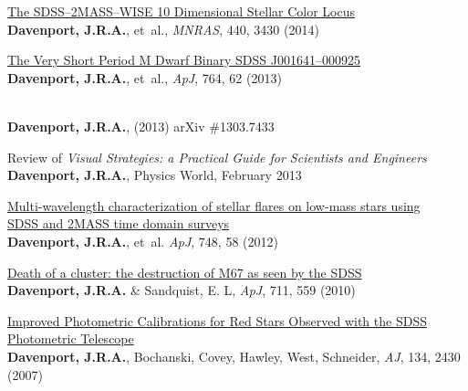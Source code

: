 \documentclass{article}
\begin{document}
\begin{llist}
\begin{etaremune}[leftmargin=10pt]
\item{\sc \href{http://adsabs.harvard.edu/abs/2014MNRAS.440.3430D}{\color{NavyBlue}The SDSS--2MASS--WISE 10 Dimensional Stellar Color Locus}}\\
{\bf Davenport, J.R.A.}, et~al., {\em MNRAS}, 440, 3430 (2014)


\item{\sc \href{http://adsabs.harvard.edu/abs/2013ApJ...764...62D}{\color{NavyBlue}The Very Short Period M Dwarf Binary SDSS J001641--000925}}\\
{\bf Davenport, J.R.A.}, et~al., {\em ApJ}, 764, 62 (2013)

\item\href{http://arxiv.org/abs/1303.7433}{\color{NavyBlue}{\sc Unidentified Moving Objects in Next Generation Time Domain Surveys}}\\
{\bf Davenport, J.R.A.}, (2013) arXiv \#1303.7433

\item\href{http://physicsworld.com/cws/article/print/2013/feb/14/visible-improvements}{\color{NavyBlue}{\sc Visible Improvements,}} Review of {\it Visual Strategies: a Practical Guide for Scientists and Engineers} {\bf Davenport, J.R.A.},  Physics World, February 2013


\item{\sc \href{http://adsabs.harvard.edu/abs/2012ApJ...748...58D}{\color{NavyBlue}Multi-wavelength characterization of stellar flares on low-mass stars using \\SDSS and 2MASS time domain surveys}}\\
{\bf Davenport, J.R.A.}, et~al. {\em ApJ}, 748, 58 (2012)

\item{\sc \href{http://adsabs.harvard.edu/abs/2010ApJ...711..559D}{\color{NavyBlue}Death of a cluster: the destruction of M67 as seen by the SDSS}}\\
{\bf Davenport, J.R.A.} \& Sandquist, E. L, {\em ApJ}, 711, 559 (2010)


 \item{\sc \href{http://adsabs.harvard.edu/abs/2007AJ....134.2430D}{\color{NavyBlue}Improved Photometric Calibrations for Red Stars Observed with the SDSS \\Photometric Telescope}}\\
{\bf Davenport, J.R.A.}, Bochanski, Covey, Hawley, West, Schneider, {\em AJ}, 134, 2430 (2007)
 

\end{etaremune}
\end{llist}
\end{document}
